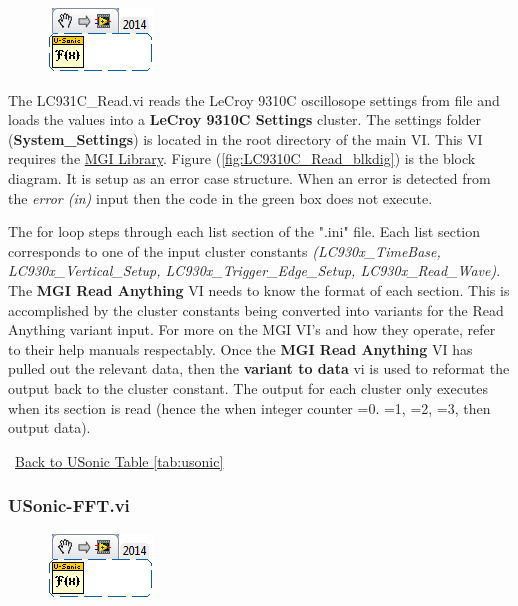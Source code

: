 \documentclass[11pt,a4paper,oldfontcommands]{memoir}
\begin{document}
\begin{figure}[h]
	\includegraphics[scale=0.625]{USonic-FFT_main_01}
	\label{fig:USonic-Gates-edit_main_01}
\end{figure}

The LC931C\_Read.vi reads the LeCroy 9310C oscillosope settings from file and loads the values into a \textbf{LeCroy 9310C Settings} cluster. The settings folder (\textbf{System\_Settings}) is located in the root directory of the main VI. This VI requires the \href{http://sine.ni.com/nips/cds/view/p/lang/en/nid/209753}{MGI Library}. Figure (\ref{fig:LC9310C_Read_blkdig}) is the block diagram.  It is setup as an error case structure. When an error is detected from the \textit{error (in)} input then the code in the green box does not execute.

The for loop steps through each list section of the ".ini" file. Each list section corresponds to one of the input cluster constants \textit{(LC930x\_TimeBase, LC930x\_Vertical\_Setup, LC930x\_Trigger\_Edge\_Setup, LC930x\_Read\_Wave)}. The \textbf{MGI Read Anything} VI needs to know the format of each section. This is accomplished by the cluster constants being converted into variants for the Read Anything variant input.  For more on the MGI VI's and how they operate, refer to their help manuals respectably. Once the \textbf{MGI Read Anything} VI has pulled out the relevant data, then the \textbf{variant to data} vi is used to reformat the output back to the cluster constant. The output for each cluster only executes when its section is read (hence the when integer counter =0. =1, =2, =3, then output data).

\noindent\hrulefill\, \hyperref[tab:usonic]{Back to USonic Table \ref{tab:usonic}}

\subsubsection{USonic-FFT.vi} \label{USonic-FFT}
\noindent\hrulefill

\begin{figure}[h]
	\includegraphics[scale=0.625]{USonic-FFT_main_01}
	\label{fig:USonic-FFT_main_01}
\end{figure}
\end{document}

